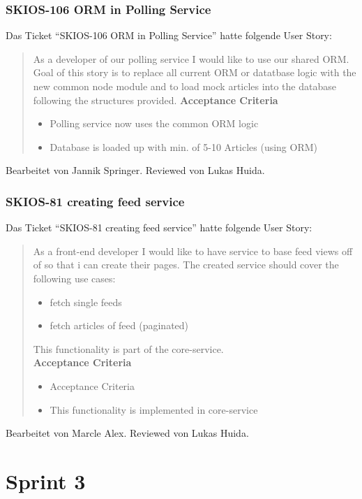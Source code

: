 \subsubsection{SKIOS-106 ORM in Polling Service}
Das Ticket \enquote{SKIOS-106 ORM in Polling Service} hatte folgende User Story:
\begin{quotation}
    As a developer of our polling service I would like to use our shared ORM.
    Goal of this story is to replace all current ORM or datatbase logic with the new common node module and to load mock articles into the database following the structures provided.
\textbf{Acceptance Criteria}
\begin{itemize}
    \item Polling service now uses the common ORM logic
    \item Database is loaded up with min. of 5-10 Articles (using ORM)
\end{itemize}
\end{quotation}
Bearbeitet von Jannik Springer.
Reviewed von Lukas Huida.

\subsubsection{SKIOS-81 creating feed service}
Das Ticket \enquote{SKIOS-81 creating feed service} hatte folgende User Story:
\begin{quotation}
As a front-end developer I would like to have service to base feed views off of so that i can create their pages.
The created service should cover the following use cases:
\begin{itemize}
    \item fetch single feeds
    \item fetch articles of feed (paginated)
\end{itemize}
This functionality is part of the core-service.\\
\textbf{Acceptance Criteria}
\begin{itemize}
    \item Acceptance Criteria
    \item This functionality is implemented in core-service
\end{itemize}
\end{quotation}
Bearbeitet von Marcle Alex.
Reviewed von Lukas Huida.

\section{Sprint 3}

